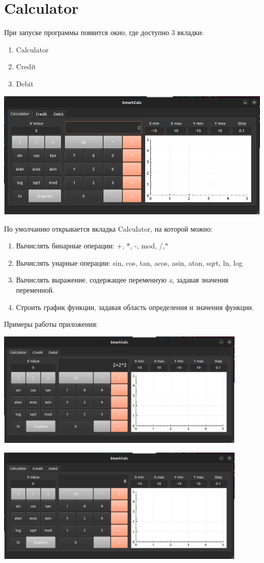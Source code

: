 \documentclass[12pt, letterpaper, twoside]{article}
\begin{document}
	\section{Calculator}
	При запуске программы появится окно, где доступно 3 вкладки:
	\begin{enumerate}
		\item Calculator
		\item Credit
		\item Debit
	\end{enumerate}
\centering
	\par \includegraphics[width=15cm]{1}
	\par По умолчанию открывается вкладка Calculator, на которой можно:
	\begin{enumerate}		
		\item Вычислять бинарные операции: +, *, -, mod, /,\verb!^!
		\item Вычислять унарные операции: sin, cos, tan, acos, asin, atan, sqrt, ln, log
		\item Вычислять выражение, содержащее переменную \textit{x}, задавая значения переменной.
		\item Строить график функции, задавая область определения и значения функции.
	\end{enumerate}
		
	\par Примеры работы приложения:
	
	\par \includegraphics[width=12cm]{2}
	\par \includegraphics[width=12cm]{3}
	
\end{document}
